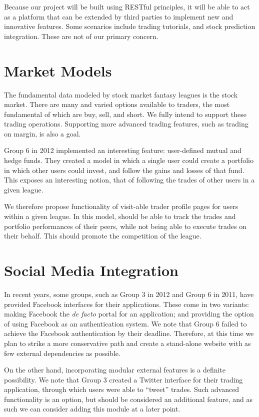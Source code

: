 \documentclass[11pt,letterpaper,oneside]{memoir}
\begin{document}
Because our project will be built using RESTful principles, it will be able to act as a
platform that can be extended by third parties to implement new and innovative features.
Some scenarios include trading tutorials, and stock prediction integration.  These are not
of our primary concern.

\section{Market Models}

The fundamental data modeled by stock market fantasy leagues is the stock market. There
are many and varied options available to traders, the most fundamental of which are
buy, sell, and short. We fully intend to support these trading operations. Supporting 
more advanced trading features, such as trading on margin, is also a goal. 

Group 6 in 2012 implemented an interesting feature: user-defined mutual and hedge funds.
They created a model in which a single user could create a portfolio in which other 
users could invest, and follow the gains and losses of that fund. This exposes an interesting
notion, that of following the trades of other users in a given league. 

We therefore propose functionality of visit-able trader profile pages for 
users within a given league. In this model, should be able to track the trades 
and portfolio performances of their peers, while not being able to execute trades 
on their behalf. This should promote the competition of the league.

\section{Social Media Integration}

In recent years, some groups, such as Group 3 in 2012 and Group 6 in 2011, have provided
Facebook interfaces for their applications. These come in two variants: making Facebook
the \emph{de facto} portal for an application; and providing the option of using Facebook
as an authentication system. We note that Group 6 failed to achieve the Facebook authentication
by their deadline. Therefore, at this time we plan to strike a more conservative path and
create a stand-alone website with as few external dependencies as possible.

On the other hand, incorporating modular external features is a definite possibility. We note
that Group 3 created a Twitter interface for their trading application, through which users
were able to ``tweet'' trades. Such advanced functionality is an option, but should be considered
an additional feature, and as such we can consider adding this module at a later point.
\end{document}
